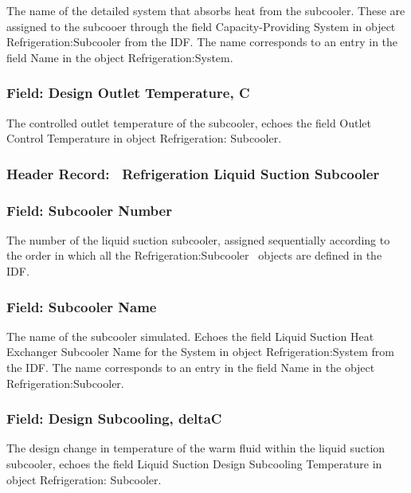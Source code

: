 The name of the detailed system that absorbs heat from the subcooler. These are assigned to the subcooer through the field Capacity-Providing System in object Refrigeration:Subcooler from the IDF. The name corresponds to an entry in the field Name in the object Refrigeration:System.

\subsubsection{Field: Design Outlet Temperature, C}\label{field-design-outlet-temperature-c}

The controlled outlet temperature of the subcooler, echoes the field Outlet Control Temperature in object Refrigeration: Subcooler.

\subsubsection{Header Record:~ Refrigeration Liquid Suction Subcooler}\label{header-record-refrigeration-liquid-suction-subcooler}

\subsubsection{Field: Subcooler Number}\label{field-subcooler-number-2}

The number of the liquid suction subcooler, assigned sequentially according to the order in which all the Refrigeration:Subcooler~ objects are defined in the IDF.

\subsubsection{Field: Subcooler Name}\label{field-subcooler-name-2}

The name of the subcooler simulated. Echoes the field Liquid Suction Heat Exchanger Subcooler Name for the System in object Refrigeration:System from the IDF. The name corresponds to an entry in the field Name in the object Refrigeration:Subcooler.

\subsubsection{Field: Design Subcooling, deltaC}\label{field-design-subcooling-deltac}

The design change in temperature of the warm fluid within the liquid suction subcooler, echoes the field Liquid Suction Design Subcooling Temperature in object Refrigeration: Subcooler.

